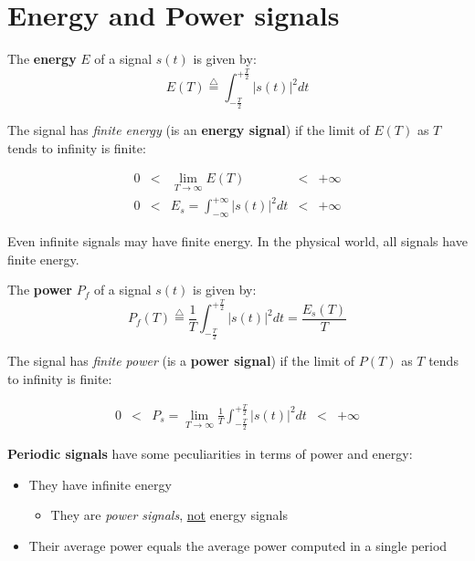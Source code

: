 \section{Energy and Power signals}
\begin{definition}[Energy]
   The \textbf{energy} $E$ of a signal $s(t)$ is given by:
   \begin{equation}
      E(T) \stackrel{\triangle}{=} \int_{-\frac{T}{2}}^{+\frac{T}{2}} |s(t)|^2 dt
   \end{equation}
\end{definition}

The signal has \textit{finite energy} (is an \textbf{energy signal}) if the limit of $E(T)$ as $T$ tends to infinity is finite:

\begin{align}
0 & < & \lim_{T \to \infty} E(T) &< & +\infty\\
0 & < & E_s = \int_{-\infty}^{+\infty} |s(t)|^2 dt &< & +\infty
\end{align}

Even infinite signals may have finite energy. In the physical world, all signals have finite energy.

\nl

\begin{definition}[Power]
   The \textbf{power} $P_f$ of a signal $s(t)$ is given by:
   \begin{equation}
   P_f(T) \stackrel{\triangle}{=} \frac{1}{T} \int_{-\frac{T}{2}}^{+\frac{T}{2}} |s(t)|^2 dt = \frac{E_s(T)}{T}
   \end{equation}
\end{definition}

The signal has \textit{finite power} (is a \textbf{power signal}) if the limit of $P(T)$ as $T$ tends to infinity is finite:

\begin{align}
   0 & < & P_s = \lim_{T \to \infty} \frac{1}{T} \int_{-\frac{T}{2}}^{+\frac{T}{2}} |s(t)|^2 dt & < & +\infty
\end{align}

\textbf{Periodic signals} have some peculiarities in terms of power and energy:
\begin{itemize}
   \item They have infinite energy
   \begin{itemize}
      \item They are \textit{power signals}, \ul{not} energy signals
   \end{itemize}
   \item Their average power equals the average power computed in a single period 
\end{itemize} 

